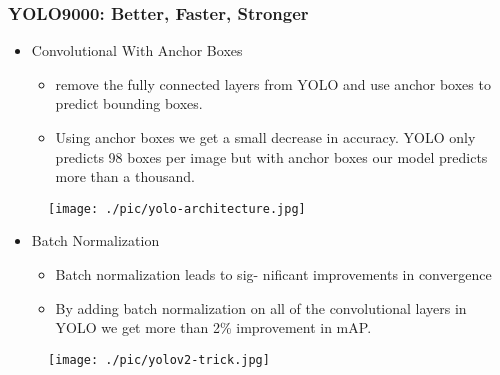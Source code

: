 \documentclass{beamer}
\begin{document}
\begin{frame}
  \frametitle{YOLO9000: Better, Faster, Stronger}
  \begin{itemize}
  \item Convolutional With Anchor Boxes
    \begin{itemize}
    \item remove the fully connected layers from YOLO and use anchor boxes to
      predict bounding boxes.
    \item Using anchor boxes we get a small decrease in accuracy. YOLO only
      predicts 98 boxes per image but with anchor boxes our model predicts
      more than a thousand.
    \end{itemize}

  \end{itemize}

  \begin{figure}[!htb]
    \centering
    \texttt{[image: ./pic/yolo-architecture.jpg]}
  \end{figure}
  
\end{frame}

\begin{frame}

  \begin{itemize}
  \item Batch Normalization
    \begin{itemize}
    \item Batch normalization leads to sig- nificant improvements in convergence 
    \item By adding batch normalization on all of the convolutional layers in
      YOLO we get more than 2\% improvement in mAP. 
    \end{itemize}
  \end{itemize}
\end{frame}

\begin{frame}

  \begin{figure}[!htb]
    \centering
    \texttt{[image: ./pic/yolov2-trick.jpg]}
  \end{figure}
\end{frame}
\end{document}

